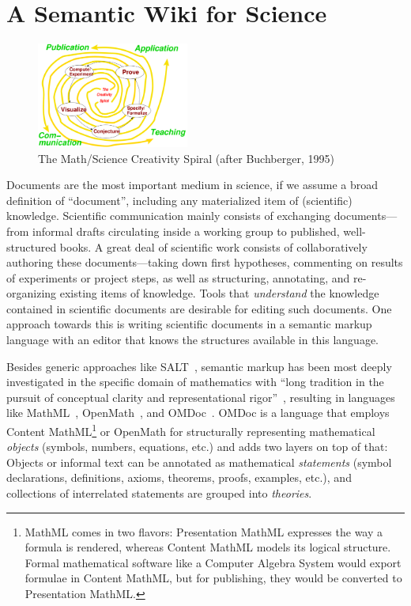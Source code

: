 \section{A Semantic Wiki for Science}

\begin{figure}
  \centering
  \vspace{-.5cm}
  \includegraphics[width=5cm]{creativity-spiral}
  \vspace{-.5cm}
  \caption{The Math/Science Creativity Spiral (after Buchberger, 1995)}
  \label{fig:creativity-spiral}
\end{figure}

Documents are the most important medium in science, if we assume a broad definition of
``document'', including any materialized item of (scientific) knowledge.  Scientific
communication mainly consists of exchanging documents---from informal drafts circulating
inside a working group to published, well-structured books.  A great deal of scientific
work consists of collaboratively authoring these documents---taking down first hypotheses,
commenting on results of experiments or project steps, as well as structuring, annotating,
and re-organizing existing items of knowledge.  Tools that
\emph{understand} the knowledge contained in scientific documents are desirable for
editing such documents.  One approach towards this is writing scientific documents in a
semantic markup language with an editor that knows the structures available in this
language.

Besides generic approaches like SALT~\cite{Groza:SALT07}, semantic markup has been most
deeply investigated in the specific domain of mathematics with ``long tradition in the
pursuit of conceptual clarity and representational rigor''~\cite{Kohlhase:omdoc1.2},
resulting in languages like MathML~\cite{CarlisleEd:MathML07},
OpenMath~\cite{BusCapCar:2oms04}, and OMDoc~\cite{Kohlhase:omdoc1.2}.  OMDoc is a language
that employs Content MathML\footnote{MathML comes in two flavors: Presentation MathML
  expresses the way a formula is rendered, whereas Content MathML models its logical
  structure.  Formal mathematical software like a Computer Algebra System would export
  formulae in Content MathML, but for publishing, they would be converted to Presentation
  MathML.} or OpenMath for structurally representing mathematical \emph{objects} (symbols,
numbers, equations, etc.) and adds two layers on top of that: Objects or informal text can
be annotated as mathematical \emph{statements} (symbol declarations, definitions, axioms,
theorems, proofs, examples, etc.), and collections of interrelated statements are grouped
into \emph{theories}.

